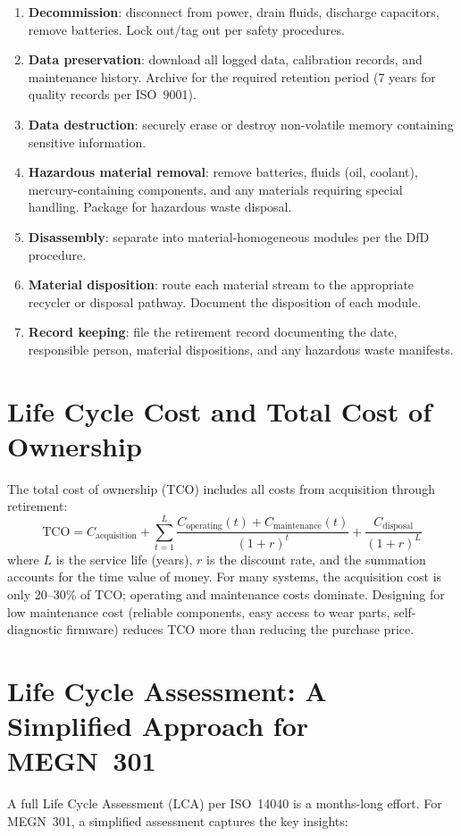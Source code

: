 \begin{enumerate}[leftmargin=1.5em]
\item \textbf{Decommission}: disconnect from power, drain fluids, discharge capacitors, remove batteries. Lock out/tag out per safety procedures.
\item \textbf{Data preservation}: download all logged data, calibration records, and maintenance history. Archive for the required retention period (7 years for quality records per ISO~9001).
\item \textbf{Data destruction}: securely erase or destroy non-volatile memory containing sensitive information.
\item \textbf{Hazardous material removal}: remove batteries, fluids (oil, coolant), mercury-containing components, and any materials requiring special handling. Package for hazardous waste disposal.
\item \textbf{Disassembly}: separate into material-homogeneous modules per the DfD procedure.
\item \textbf{Material disposition}: route each material stream to the appropriate recycler or disposal pathway. Document the disposition of each module.
\item \textbf{Record keeping}: file the retirement record documenting the date, responsible person, material dispositions, and any hazardous waste manifests.
\end{enumerate}

\section{Life Cycle Cost and Total Cost of Ownership}
The total cost of ownership (TCO) includes all costs from acquisition through retirement:
\begin{equation}
\text{TCO} = C_{\text{acquisition}} + \sum_{t=1}^{L} \frac{C_{\text{operating}}(t) + C_{\text{maintenance}}(t)}{(1+r)^t} + \frac{C_{\text{disposal}}}{(1+r)^L}
\end{equation}
where $L$ is the service life (years), $r$ is the discount rate, and the summation accounts for the time value of money. For many systems, the acquisition cost is only 20--30\% of TCO; operating and maintenance costs dominate. Designing for low maintenance cost (reliable components, easy access to wear parts, self-diagnostic firmware) reduces TCO more than reducing the purchase price.

\section{Life Cycle Assessment: A Simplified Approach for MEGN~301}
A full Life Cycle Assessment (LCA) per ISO~14040 is a months-long effort. For MEGN~301, a simplified assessment captures the key insights:

